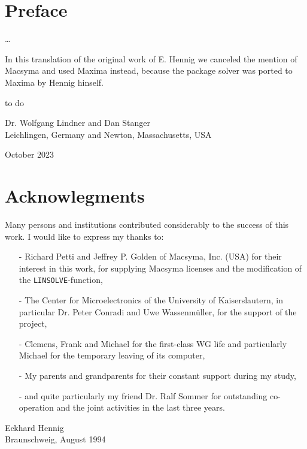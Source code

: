 \documentclass[11pt]{report}           %
\begin{document}
\chapter*{Preface}
\thispagestyle{empty}

\dots

In this translation of the original work of E. Hennig we canceled the mention of Macsyma and used Maxima instead, because the package solver was ported to Maxima by Hennig hinself.
 
to do

\vspace{1cm}

Dr. Wolfgang Lindner  and Dan Stanger  \\
Leichlingen, Germany and Newton, Massachusetts, USA

October 2023

\cleardoublepage




\chapter*{Acknowlegments}
\thispagestyle{empty}
Many persons and institutions contributed considerably to the success of this work. 
I would like to express my thanks to:
\vspace{1cm}
\begin{itemize}
\item[-] Richard Petti and Jeffrey P. Golden of Macsyma, Inc. (USA) for their interest in this work,
   for supplying Macsyma licenses and the modification of the  \verb+LINSOLVE+-function,
\item[-] The Center for Microelectronics of the University of Kaiserslautern, in particular
   Dr. Peter Conradi and Uwe Wassenm\"uller, for the support of the project,
   
\item[-] Clemens, Frank and Michael for the first-class WG life and particularly Michael for the
   temporary leaving of its computer,
\item[-] My parents and grandparents for their constant support during my study,
\item[-] and quite particularly my friend Dr. Ralf Sommer for outstanding co-operation and the
   joint activities in the last three years.
\end{itemize}
\vspace{1cm}
Eckhard Hennig \\
Braunschweig, August 1994
\end{document}
